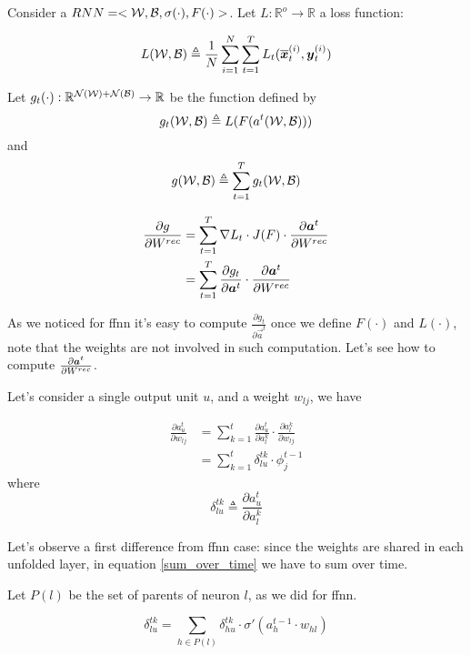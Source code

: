 Consider a $RNN=<\mathcal{W},\mathcal{B},\sigma(\cdot),F(\cdot)>$. Let $L:\mathbb{R}^o \rightarrow \mathbb{R}$ a loss function:

$$L(\mathcal{W},\mathcal{B})\triangleq\frac{1}{N}\sum_{i=1}^N \sum_{t=1}^T L_t(\overline{\boldsymbol{x}}_t^{(i)},\boldsymbol{y}_t^{(i)}) $$

Let $g_t(\cdot):\mathbb{R}^{\mathcal{N}(\mathcal{W})+\mathcal{N}(\mathcal{B})} \rightarrow \mathbb{R}$ be the function defined by
$$g_t(\mathcal{W},\mathcal{B}) \triangleq L(F(a^t(\mathcal{W},\mathcal{B})))$$
and $$g(\mathcal{W},\mathcal{B}) \triangleq \sum_{t=1}^T g_t(\mathcal{W},\mathcal{B})$$



\begin{align}
\frac{\partial g}{\partial W^{rec}} &= \sum_{t=1}^T \nabla L_t \cdot J(F) \cdot \frac{\partial \boldsymbol{a}^t}{\partial W^{rec}}\\
&= \sum_{t=1}^T\frac{\partial g_t}{\partial \boldsymbol{a}^t} \cdot \frac{\partial \boldsymbol{a}^t}{\partial W^{rec}}
\end{align}

As we noticed for ffnn it's easy to compute $\frac{\partial g_t}{\partial \vec{a}^t}$ once we define $F(\cdot)$ and $L(\cdot)$, note that the weights are not involved in such computation.
Let's see how to compute $\frac{\partial \boldsymbol{a}^t}{\partial W^{rec}}$.

Let's consider a single output unit $u$, and a weight $w_{lj}$, we have

\begin{align}
 \label{sum_over_time}
 \frac{\partial a^t_u}{\partial w_{lj}} &= \sum_{k=1}^t \frac{\partial a_u^t}{\partial a^k_l} \cdot \frac{\partial a^k_l}{\partial w_{lj}}\\
 &= \sum_{k=1}^t \delta^{tk}_{lu} \cdot \phi_j^{t-1}
\end{align}
where
\begin{equation}
\delta_{lu}^{tk} \triangleq \frac{\partial a_u^t}{\partial a^k_l}
\end{equation}

Let's observe a first difference from ffnn case: since the weights are shared in each unfolded layer, in equation \ref{sum_over_time} we have to sum over time.

Let $P(l)$ be the set of parents of neuron $l$, as we did for ffnn.

\begin{equation}
 \delta_{lu}^{tk} = \sum_{h\in P(l)} \delta_{hu}^{tk} \cdot \sigma'(a_h^{t-1}\cdot w_{hl})
\end{equation}

